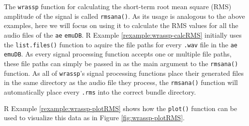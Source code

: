 \documentclass[]{book}
\newenvironment{Shaded}{\begin{snugshade}}{\end{snugshade}}
\newcommand{\CommentTok}[1]{\textcolor[rgb]{0.56,0.35,0.01}{\textit{#1}}}
\newcommand{\DataTypeTok}[1]{\textcolor[rgb]{0.13,0.29,0.53}{#1}}
\newcommand{\DecValTok}[1]{\textcolor[rgb]{0.00,0.00,0.81}{#1}}
\newcommand{\KeywordTok}[1]{\textcolor[rgb]{0.13,0.29,0.53}{\textbf{#1}}}
\newcommand{\NormalTok}[1]{#1}
\newcommand{\OperatorTok}[1]{\textcolor[rgb]{0.81,0.36,0.00}{\textbf{#1}}}
\newcommand{\OtherTok}[1]{\textcolor[rgb]{0.56,0.35,0.01}{#1}}
\newcommand{\StringTok}[1]{\textcolor[rgb]{0.31,0.60,0.02}{#1}}
\theoremstyle{definition}
\theoremstyle{definition}
\theoremstyle{definition}
\theoremstyle{remark}
\begin{document}
The \texttt{wrassp} function for calculating the short-term root mean
square (RMS) amplitude of the signal is called \texttt{rmsana()}. As its
usage is analogous to the above examples, here we will focus on using it
to calculate the RMS values for all the audio files of the \texttt{ae}
\texttt{emuDB}. R Example \ref{rexample:wrassp-calcRMS} initially uses
the \texttt{list.files()} function to aquire the file paths for every
\texttt{.wav} file in the \texttt{ae} \texttt{emuDB}. As every signal
processing function accepts one or multiple file paths, these file paths
can simply be passed in as the main argument to the \texttt{rmsana()}
function. As all of \texttt{wrassp}'s signal processing functions place
their generated files in the same directory as the audio file they
process, the \texttt{rmsana()} function will automatically place every
\texttt{.rms} into the correct bundle directory.

\begin{Shaded}
\end{Shaded}

R Example \ref{rexample:wrassp-plotRMS} shows how the \texttt{plot()}
function can be used to visualize this data as in Figure
\ref{fig:wrassp-plotRMS}.
\end{document}
